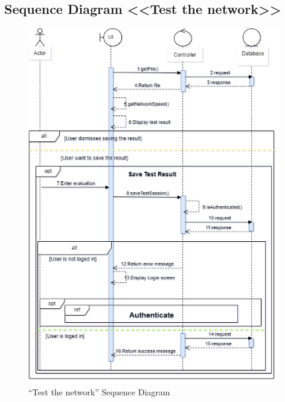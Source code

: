 \newpage

\subsection{Sequence Diagram <<Test the network>> }



\begin{figure}[H]
   
    
    \includegraphics[width=0.98\textwidth]{images/sprint2/testNetworkSeq.png}
    \caption{“Test the network” Sequence Diagram}
    \label{fig:enter-label}
    
\end{figure}
\newpage
